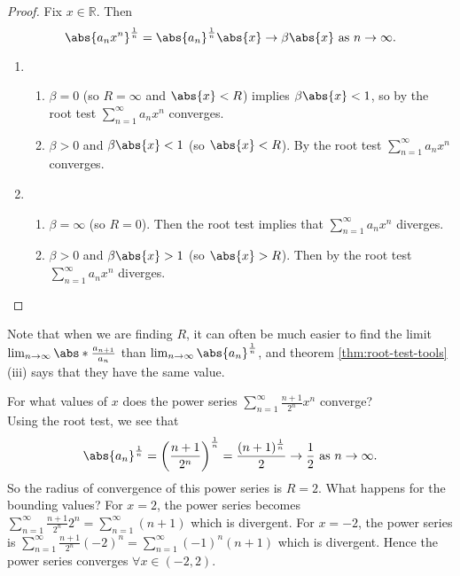 \documentclass[../real_analysis.tex]{subfiles}
\begin{document}
        \begin{proof}
            Fix $x\in\mathbb{R}$. Then
            \begin{equation}
                \abs{a_nx^n}^\frac{1}{n}=\abs{a_n}^\frac{1}{n}\abs{x}\to\beta\abs{x}\text{ as }n\to\infty.
            \end{equation}
            \begin{enumerate}[label={\upshape(\roman*)}]
                \item\begin{enumerate}[label={\upshape(\alph*)}]
                    \item $\beta=0$ (so $R=\infty$ and $\abs{x}<R$) implies $\beta\abs{x}<1$, so by the root test $\sum_{n=1}^\infty a_nx^n$ converges.
                    \item $\beta>0$ and $\beta\abs{x}<1$ (so $\abs{x}<R$). By the root test $\sum_{n=1}^\infty a_nx^n$ converges.
                \end{enumerate}
                \item\begin{enumerate}[label={\upshape(\alph*)}]
                    \item $\beta=\infty$ (so $R=0$). Then the root test implies that $\sum_{n=1}^\infty a_nx^n$ diverges.
                    \item $\beta>0$ and $\beta\abs{x}>1$ (so $\abs{x}>R$). Then by the root test $\sum_{n=1}^\infty a_nx^n$ diverges.
                \end{enumerate}
            \end{enumerate}
        \end{proof}
        Note that when we are finding $R$, it can often be much easier to find the limit $\lim_{n\to\infty}\abs*{\frac{a_{n+1}}{a_n}}$ than $\lim_{n\to\infty}\abs{a_n}^\frac{1}{n}$, and theorem \ref{thm:root-test-tools} (iii) says that they have the same value.
        \begin{example}
            For what values of $x$ does the power series $\sum_{n=1}^\infty\frac{n+1}{2^n}x^n$ converge?\\
            Using the root test, we see that
            \begin{equation}
                \abs{a_n}^\frac{1}{n}=\left(\frac{n+1}{2^n}\right)^\frac{1}{n}=\frac{(n+1)^\frac{1}{n}}{2}\to\frac{1}{2}\text{ as }n\to\infty.
            \end{equation}
            So the radius of convergence of this power series is $R=2$. What happens for the bounding values? For $x=2$, the power series becomes $\sum_{n=1}^\infty\frac{n+1}{2^n}2^n=\sum_{n=1}^\infty(n+1)$ which is divergent. For $x=-2$, the power series is $\sum_{n=1}^\infty\frac{n+1}{2^n}(-2)^n=\sum_{n=1}^\infty(-1)^n(n+1)$ which is divergent. %
            Hence the power series converges $\forall x\in(-2, 2)$.
        \end{example}
\end{document}
